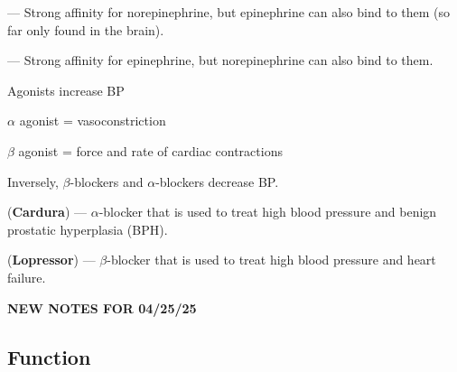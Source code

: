 \begin{coloredlist}
    \item {} — Strong affinity for norepinephrine, but epinephrine can also bind to them (so far only found in the brain).
    \item {} — Strong affinity for epinephrine, but norepinephrine can also bind to them.
    \item Agonists increase BP
    \begin{coloredlist}
        \item \(\alpha\) agonist = vasoconstriction
        \item \(\beta\) agonist = force and rate of cardiac contractions
    \end{coloredlist}
    \item Inversely, \(\beta\)-blockers and \(\alpha\)-blockers decrease BP.
    \begin{coloredlist}
        \item {} (\textbf{Cardura}) — \(\alpha\)-blocker that is used to treat high blood pressure and benign prostatic hyperplasia (BPH).
        \item {} (\textbf{Lopressor}) — \(\beta\)-blocker that is used to treat high blood pressure and heart failure.
    \end{coloredlist}
\end{coloredlist}


\begin{center}
    \textbf{NEW NOTES FOR 04/25/25} \\
    \hrulefill
\end{center}


\subsection{Function}

